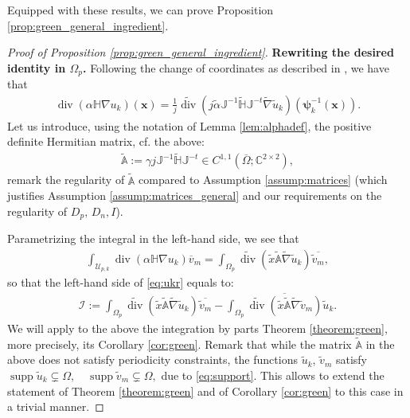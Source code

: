 \documentclass[report]{elsarticle}
\numberwithin{theorem}{section}
\newcommand{\bpsi}{\boldsymbol{\psi}}
\renewcommand{\vec}[1]{\mathbf{#1}}
\begin{document}
Equipped with these  results, we can prove Proposition \ref{prop:green_general_ingredient}.
\begin{proof}[Proof of Proposition \ref{prop:green_general_ingredient}] 
\textbf{Rewriting the desired identity in $\Omega_p$. }
Following  the change of coordinates as described in \cite[Section 2.1.3]{boffi}, we have that
	\begin{align*}
		\operatorname{div}(\alpha \mathbb{H}\nabla u_k)(\vec{x})=\frac{1}{j}\widetilde{\operatorname{div}}(j\widetilde{\alpha}\mathbb{J}^{-1}\widetilde{\mathbb{H}}\mathbb{J}^{-t}\widetilde{\nabla}\widetilde{u}_k)(\bpsi_k^{-1}(\vec{x})).
	\end{align*}
Let us introduce, using the notation of Lemma \ref{lem:alphadef}, the positive definite Hermitian matrix, cf. the above:
\begin{align}
	\label{eq:atilde}
	\widetilde{\mathbb{A}}:=\gamma j \mathbb{J}^{-1}\widetilde{\mathbb{H}}\mathbb{J}^{-t}\in C^{1,1}(\overline{\Omega}; \mathbb{C}^{2\times 2}), 
\end{align}
remark the regularity of $\widetilde{\mathbb{A}}$ compared to Assumption \ref{assump:matrices} (which justifies Assumption \ref{assump:matrices_general} and our requirements on the regularity of $D_p, \, D_n, I$). 
 
Parametrizing the integral in the left-hand side, we see that 
	\begin{align}
		\label{eq:lhs_paramerization}
		\int_{\mathcal{U}_{p,k}}\operatorname{div}(\alpha \mathbb{H}\nabla u_k)\overline{{v}}_m=\int_{\Omega_p}\widetilde{\operatorname{div}}(\tilde{x}	\widetilde{\mathbb{A}}\widetilde{\nabla}\widetilde{u}_k)\overline{\widetilde{v}_m},
	\end{align}
	so that the left-hand side of \eqref{eq:ukr} equals to:
	\begin{align}
		\label{eq:I}
		\mathcal{I}:=\int_{\Omega_p}\widetilde{\operatorname{div}}(\tilde{x}	\widetilde{\mathbb{A}}\widetilde{\nabla}\widetilde{u}_k)\overline{\widetilde{v}_m}-\int_{\Omega_p}\overline{\widetilde{\operatorname{div}}(\tilde{x}	\widetilde{\mathbb{A}}\widetilde{\nabla}\widetilde{v}_m)}{\widetilde{u}_k}.
	\end{align}
	We will apply to the above the integration by parts Theorem \ref{theorem:green}, more precisely, its Corollary \ref{cor:green}. Remark that while the matrix  $\widetilde{\mathbb{A}}$ in the above does not satisfy periodicity constraints, the functions $\widetilde{u}_k$, $\widetilde{v}_m$ satisfy
$
		\operatorname{supp}\widetilde{u}_k\subsetneq \Omega, \quad \operatorname{supp}\widetilde{v}_m\subsetneq \Omega,$ 
	due to \eqref{eq:support}. This allows to extend the statement of Theorem \ref{theorem:green} and of Corollary \ref{cor:green} to this case in a trivial manner.  
	

\end{proof}
\end{document}
